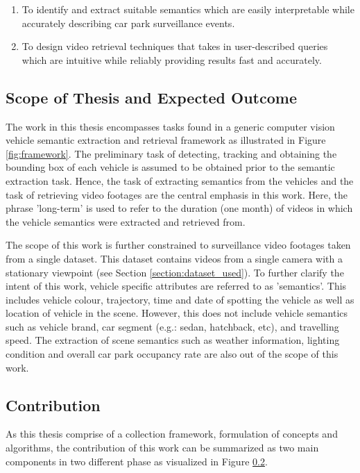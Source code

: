 \begin{enumerate}
\item To identify and extract suitable semantics which are easily interpretable while accurately describing car park surveillance events.
\item To design video retrieval techniques that takes in user-described queries which are intuitive while reliably providing results fast and accurately.
\end{enumerate}

\subsection{Scope of Thesis and Expected Outcome}
\label{subsec:scope}
The work in this thesis encompasses tasks found in a generic computer vision vehicle semantic extraction and retrieval framework as illustrated in Figure \ref{fig:framework}. The preliminary task of detecting, tracking and obtaining the bounding box of each vehicle is assumed to be obtained prior to the semantic extraction task. Hence, the task of extracting semantics from the vehicles and the task of retrieving video footages are the central emphasis in this work. Here, the phrase 'long-term' is used to refer to the duration (one month) of videos in which the vehicle semantics were extracted and retrieved from.

The scope of this work is further constrained to surveillance video footages taken from a single dataset. This dataset contains videos from a single camera with a stationary viewpoint (see Section \ref{section:dataset_used}). To further clarify the intent of this work, vehicle specific attributes are referred to as 'semantics'. This includes vehicle colour, trajectory, time and date of spotting the vehicle as well as location of vehicle in the scene. However, this does not include vehicle semantics such as vehicle brand, car segment (e.g.: sedan, hatchback, etc), and travelling speed. The extraction of scene semantics such as weather information, lighting condition and overall car park occupancy rate are also out of the scope of this work.


\subsection{Contribution}
As this thesis comprise of a collection framework, formulation of concepts and algorithms, the contribution of this work can be summarized as two main components in two different phase as visualized in Figure \ref{}.


